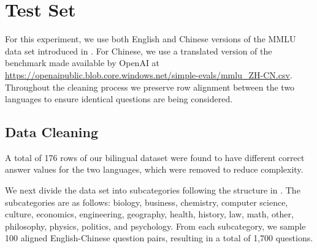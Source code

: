 \section{Test Set}
\label{sec:dataset}

For this experiment, we use both English and Chinese versions of the MMLU data set introduced in \citet{hendryckstest2021}. For Chinese, we use a translated version of the benchmark made available by OpenAI at \url{https://openaipublic.blob.core.windows.net/simple-evals/mmlu_ZH-CN.csv}. Throughout the cleaning process we preserve row alignment between the two languages to ensure identical questions are being considered.

\subsection{Data Cleaning}


A total of 176 rows of our bilingual dataset were found to have different correct answer values for the two languages, which were removed to reduce complexity.

We next divide the data set into subcategories following the structure in \citet{hendryckstest2021}. The subcategories are as follows: biology, business, chemistry, computer science, culture, economics, engineering, geography, health, history, law, math, other, philosophy, physics, politics, and psychology. From each subcategory, we sample 100 aligned English-Chinese question pairs, resulting in a total of 1,700 questions.